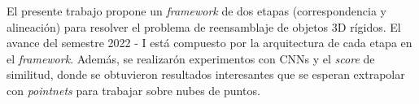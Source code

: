 
El presente trabajo propone un \textit{framework} de dos etapas (correspondencia y alineación) para resolver el problema de reensamblaje de objetos 3D rígidos. El avance del semestre 2022 - I está compuesto por la arquitectura de cada etapa en el \textit{framework}. Además, se realizarón experimentos con CNNs y el \textit{score} de similitud, donde se obtuvieron resultados interesantes que se esperan extrapolar con \textit{pointnets} para trabajar sobre nubes de puntos.

\begin{comment}
Se deben escribir de manera condensada los logros obtenidos en este proyecto de tesis y las ideas que no han podido desarrollarse en su trabajo. Las conclusiones deben guardar relación tanto con los objetivos específicos como con el objetivo general. %
\end{comment}
